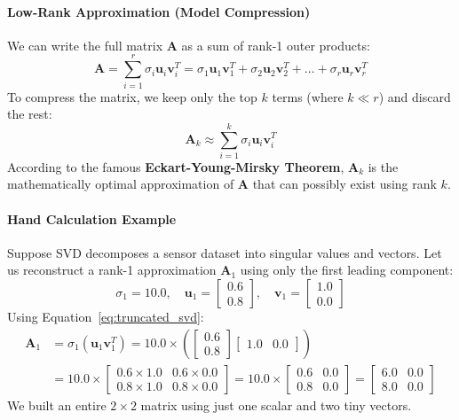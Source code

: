 \paragraph{Low-Rank Approximation (Model Compression)}
We can write the full matrix $\mathbf{A}$ as a sum of rank-1 outer products:
\begin{equation}
\mathbf{A} = \sum_{i=1}^r \sigma_i \mathbf{u}_i \mathbf{v}_i^T = \sigma_1 \mathbf{u}_1 \mathbf{v}_1^T + \sigma_2 \mathbf{u}_2 \mathbf{v}_2^T + \dots + \sigma_r \mathbf{u}_r \mathbf{v}_r^T\label{eq:svd_sum}
\end{equation}
To compress the matrix, we keep only the top $k$ terms (where $k \ll r$) and discard the rest:
\begin{equation}
\mathbf{A}_k \approx \sum_{i=1}^k \sigma_i \mathbf{u}_i \mathbf{v}_i^T\label{eq:truncated_svd}
\end{equation}
According to the famous \textbf{Eckart-Young-Mirsky Theorem}, $\mathbf{A}_k$ is the mathematically optimal approximation of $\mathbf{A}$ that can possibly exist using rank $k$.

\paragraph{Hand Calculation Example}
Suppose SVD decomposes a sensor dataset into singular values and vectors. Let us reconstruct a rank-1 approximation $\mathbf{A}_1$ using only the first leading component:
\begin{equation*}
\sigma_1 = 10.0, \quad
\mathbf{u}_1 = \begin{bmatrix} 0.6 \\ 0.8 \end{bmatrix}, \quad
\mathbf{v}_1 = \begin{bmatrix} 1.0 \\ 0.0 \end{bmatrix}
\end{equation*}
Using Equation~\ref{eq:truncated_svd}:
\begin{align*}
\mathbf{A}_1 &= \sigma_1 (\mathbf{u}_1 \mathbf{v}_1^T) = 10.0 \times \left( \begin{bmatrix} 0.6 \\ 0.8 \end{bmatrix} \begin{bmatrix} 1.0 & 0.0 \end{bmatrix} \right) \\
&= 10.0 \times \begin{bmatrix} 0.6 \times 1.0 & 0.6 \times 0.0 \\ 0.8 \times 1.0 & 0.8 \times 0.0 \end{bmatrix} = 10.0 \times \begin{bmatrix} 0.6 & 0.0 \\ 0.8 & 0.0 \end{bmatrix} = \begin{bmatrix} 6.0 & 0.0 \\ 8.0 & 0.0 \end{bmatrix}
\end{align*}
We built an entire $2 \times 2$ matrix using just one scalar and two tiny vectors.

